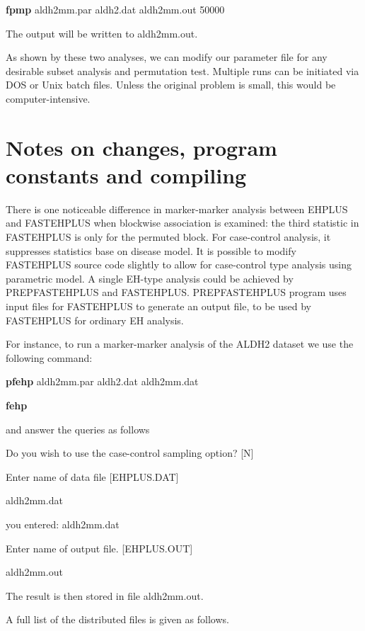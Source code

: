 \documentclass[11pt]{article}
\begin{document}
\medskip
{\bf fpmp} aldh2mm.par aldh2.dat aldh2mm.out  50000
\medskip

The output will be written to aldh2mm.out.

As shown by these two analyses, we can modify our parameter file for any
desirable subset analysis and permutation test.  Multiple runs can be initiated
via DOS or Unix batch files.  Unless the original problem is small, this would
be computer-intensive.


\section{Notes on changes, program constants and compiling}

There is one noticeable difference in marker-marker analysis between EHPLUS and
FASTEHPLUS when blockwise association is examined:  the third statistic in
FASTEHPLUS is only for the permuted block.  For case-control analysis, it
suppresses statistics base on disease model.  It is possible to modify
FASTEHPLUS source code slightly to allow for case-control type analysis using
parametric model.  A single EH-type analysis could be achieved by
PREPFASTEHPLUS and FASTEHPLUS.  PREPFASTEHPLUS program uses input files for
FASTEHPLUS to generate an output file, to be used by FASTEHPLUS for ordinary EH
analysis.

For instance, to run a marker-marker analysis of the ALDH2 dataset we use the
following command:

\medskip
{\bf pfehp} aldh2mm.par aldh2.dat aldh2mm.dat

\medskip
{\bf fehp}

\medskip
and answer the queries as follows

Do you wish to use the case-control sampling option?  [N]

Enter name of data file  [EHPLUS.DAT]

aldh2mm.dat

you entered: aldh2mm.dat

Enter name of output file.  [EHPLUS.OUT]

aldh2mm.out

\medskip
The result is then stored in file aldh2mm.out.


A full list of the distributed files is given as follows.
\end{document}

